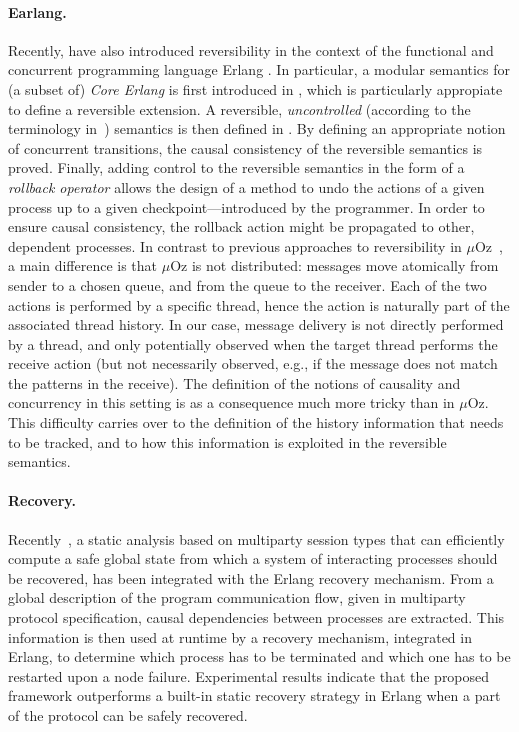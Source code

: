 \documentclass[a4paper,oneside]{article}
\begin{document}
 \paragraph{Earlang.}
Recently, \cite{NPV16,LNPV17} have also introduced reversibility in the
context of the functional and concurrent programming language Erlang
\cite{AVW96}. In particular, a modular semantics for (a subset of)
\emph{Core Erlang} \cite{CGJLNPV04} is first introduced in
\cite{NPV16}, which is particularly appropiate to define a reversible
extension. A reversible, \emph{uncontrolled} (according to the
terminology in~\cite{LMT14}) semantics is then defined in
\cite{LNPV17}. By defining an appropriate notion of concurrent
transitions, the causal consistency of the reversible semantics is
proved. Finally, adding control to the reversible semantics in the
form of a \emph{rollback operator} allows the design of a method to
undo the actions of a given process up to a given
checkpoint---introduced by the programmer. In order to ensure
causal consistency, the rollback action might be propagated to other,
dependent processes.
%
In contrast to previous approaches to reversibility in
$\mu$Oz~\cite{LLMS12,GLM14}, a main difference is that $\mu$Oz is not
distributed: messages move atomically from sender to a chosen queue,
and from the queue to the receiver. Each of the two actions is
performed by a specific thread, hence the action is naturally part of
the associated thread history. In our case, message delivery is not
directly performed by a thread, and only potentially observed when the
target thread performs the receive action (but not necessarily
observed, e.g., if the message does not match the patterns in the
receive). The definition of the notions of causality and concurrency
in this setting is as a consequence much more tricky than in
$\mu$Oz. This difficulty carries over to the definition of the history
information that needs to be tracked, and to how this information is
exploited in the reversible semantics.



\paragraph{Recovery.}
Recently~\cite{NY2017}, 
a static analysis based on multiparty session types that
 can efficiently compute a safe global state from which a system of interacting processes should be recovered, has been integrated with the Erlang recovery mechanism. From a global description of the program communication flow, given in multiparty protocol specification, 
  causal dependencies between processes are extracted. This information is then used at runtime by a recovery mechanism, integrated in Erlang, to determine which process has to be terminated and which one has to be restarted upon a node failure. Experimental results indicate that the proposed framework outperforms a built-in static recovery strategy in Erlang when a part of the protocol can be safely recovered. 
\end{document}
